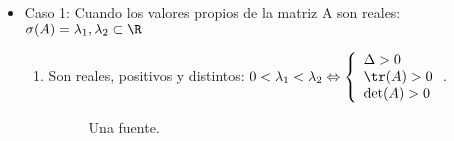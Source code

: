 

\begin{itemize}
\item Caso 1: Cuando los valores propios de la matriz A son reales: $\sigma(A)={\lambda_1,\lambda_2}\subset \R$
\begin{enumerate}
\item Son reales, positivos y distintos: $0<\lambda_1<\lambda_2 \Leftrightarrow \left\{ \begin{array}{ll}\Delta > 0 \\ \tr(A)>0 \\ \det(A) > 0 \end{array}\right.$.

  \begin{figure}[h]
    \centering
    \caption{Una fuente.}
    
  \end{figure}
  

\end{enumerate}
\end{itemize}
